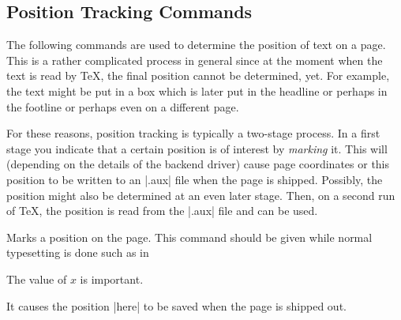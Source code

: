 \subsection{Position Tracking Commands}

The following commands are used to determine the position of text on a page.
This is a rather complicated process in general since at the moment when the
text is read by \TeX, the final position cannot be determined, yet. For
example, the text might be put in a box which is later put in the headline or
perhaps in the footline or perhaps even on a different page.

For these reasons, position tracking is typically a two-stage process. In a
first stage you indicate that a certain position is of interest by
\emph{marking} it. This will (depending on the details of the backend driver)
cause page coordinates or this position to be written to an |.aux| file when
the page is shipped. Possibly, the position might also be determined at an even
later stage. Then, on a second run of \TeX, the position is read from the
|.aux| file and can be used.

\begin{command}{\pgfsys@markposition{}}
    Marks a position on the page. This command should be given while normal
    typesetting is done such as in
\begin{codeexample}
The value of $x$ is important.
\end{codeexample}
    It causes the position |here| to be saved when the page is shipped out.
\end{command}

